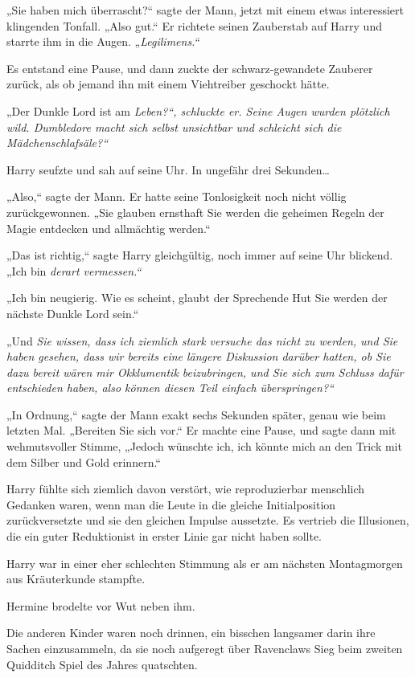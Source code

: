 {„Sie haben mich überrascht?“ sagte der Mann, jetzt mit einem etwas interessiert klingenden Tonfall. „Also gut.“ Er richtete seinen Zauberstab auf Harry und starrte ihm in die Augen. „\emph{Legilimens.“}

Es entstand eine Pause, und dann zuckte der schwarz-gewandete Zauberer zurück, als ob jemand ihn mit einem Viehtreiber geschockt hätte.

„Der Dunkle Lord ist am \emph{Leben?“, schluckte er. Seine Augen wurden plötzlich wild. \emph{Dumbledore macht sich selbst unsichtbar und schleicht sich die Mädchenschlafsäle?“}}

Harry seufzte und sah auf seine Uhr. In ungefähr drei Sekunden…

„Also,“ sagte der Mann. Er hatte seine Tonlosigkeit noch nicht völlig zurückgewonnen. „Sie glauben ernsthaft Sie werden die geheimen Regeln der Magie entdecken und allmächtig werden.“

„Das ist richtig,“ sagte Harry gleichgültig, noch immer auf seine Uhr blickend. „Ich bin \emph{derart vermessen.“}

„Ich bin neugierig. Wie es scheint, glaubt der Sprechende Hut Sie werden der nächste Dunkle Lord sein.“

„Und \emph{Sie wissen, dass ich ziemlich stark versuche das nicht zu werden, und Sie haben gesehen, dass wir bereits eine längere Diskussion darüber hatten, ob Sie dazu bereit wären mir Okklumentik beizubringen, und Sie sich zum Schluss dafür entschieden haben, also können diesen Teil einfach überspringen?“}

„In Ordnung,“ sagte der Mann exakt sechs Sekunden später, genau wie beim letzten Mal. „Bereiten Sie sich vor.“ Er machte eine Pause, und sagte dann mit wehmutsvoller Stimme, „Jedoch wünschte ich, ich könnte mich an den Trick mit dem Silber und Gold erinnern.“

Harry fühlte sich ziemlich davon verstört, wie reproduzierbar menschlich Gedanken waren, wenn man die Leute in die gleiche Initialposition zurückversetzte und sie den gleichen Impulse aussetzte. Es vertrieb die Illusionen, die ein guter Reduktionist in erster Linie gar nicht haben sollte.

Harry war in einer eher schlechten Stimmung als er am nächsten Montagmorgen aus Kräuterkunde stampfte.

Hermine brodelte vor Wut neben ihm.

Die anderen Kinder waren noch drinnen, ein bisschen langsamer darin ihre Sachen einzusammeln, da sie noch aufgeregt über Ravenclaws Sieg beim zweiten Quidditch Spiel des Jahres quatschten.

}

